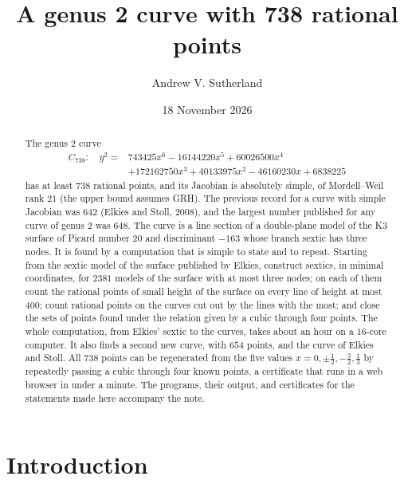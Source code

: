 \documentclass[11pt]{article}
\title{A genus 2 curve with 738 rational points}
\author{Andrew V. Sutherland}
\date{18 November 2026}
\theoremstyle{remark}
\begin{document}
\maketitle

\begin{abstract}
The genus 2 curve
\begin{align*}
C_{738}\colon\quad y^2 ={}& 743425x^6 - 16144220x^5 + 60026500x^4\\
& + 172162750x^3 + 40133975x^2 - 46160230x + 6838225
\end{align*}
has at least $738$ rational points, and its Jacobian is absolutely simple, of Mordell--Weil rank $21$ (the upper bound assumes GRH).
The previous record for a curve with simple Jacobian was $642$ (Elkies and Stoll, 2008), and the largest number published for any
curve of genus $2$ was $648$.  The curve is a line section of a double-plane model of the K3 surface of Picard number $20$ and
discriminant $-163$ whose branch sextic has three nodes.  It is found by a computation that is simple to state and to repeat.
Starting from the sextic model of the surface published by Elkies, construct sextics, in minimal coordinates, for $2381$ models of
the surface with at most three nodes; on each of them count the rational points of small height of the surface on every line of
height at most $400$; count rational points on the curves cut out by the lines with the most; and close the sets of points found
under the relation given by a cubic through four points.  The whole computation, from Elkies' sextic to the curves, takes about
an hour on a $16$-core computer.  It also finds a second new curve, with $654$ points, and the curve of Elkies and Stoll.  All $738$ points can be
regenerated from the five values $x=0,\pm\frac12,-\frac32,\frac13$ by repeatedly passing a cubic through four known points, a
certificate that runs in a web browser in under a minute.  The programs, their output, and certificates for the statements
made here accompany the note.
\end{abstract}

\section{Introduction}
\end{document}

